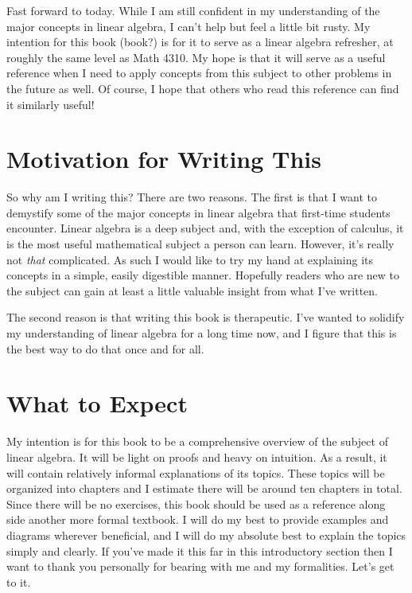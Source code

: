 \documentclass[paper=a4, fontsize=11pt,twoside]{scrartcl}   %
\begin{document}
Fast forward to today. While I am still confident in my understanding of the major concepts in linear algebra, I can't help but feel a little bit rusty. My intention for this book (book?)
is for it to serve as a linear algebra refresher, at roughly the same level as Math 4310. My hope is that it will serve as a useful reference when I need to apply concepts from this subject to other problems in the future as well. Of course, I hope that others who read this reference can find it similarly useful!

\section{Motivation for Writing This}

So why am I writing this? There are two reasons. The first is that I want to demystify some of the major concepts in linear algebra that first-time students encounter. Linear algebra is a deep subject and, with the exception of calculus, it is the most useful mathematical subject a person can learn. However, it's really not \textit{that} complicated. As such I would like to try my hand at explaining its concepts in a simple, easily digestible manner. Hopefully readers who are new to the subject can gain at least a little valuable insight from what I've written.

The second reason is that writing this book is therapeutic. I've wanted to solidify my understanding of linear algebra for a long time now, and I figure that this is the best way to do that once and for all. 

\section{What to Expect}

My intention is for this book to be a comprehensive overview of the subject of linear algebra. It will be light on proofs and heavy on intuition. As a result, it will contain relatively informal explanations of its topics. These topics will be organized into chapters and I estimate there will be around ten chapters in total. Since there will be no exercises, this book should be used as a reference along side another more formal textbook. I will do my best to provide examples and diagrams wherever beneficial, and I will do my absolute best to explain the topics simply and clearly. If you've made it this far in this introductory section then I want to thank you personally for bearing with me and my formalities. Let's get to it.
\end{document}
